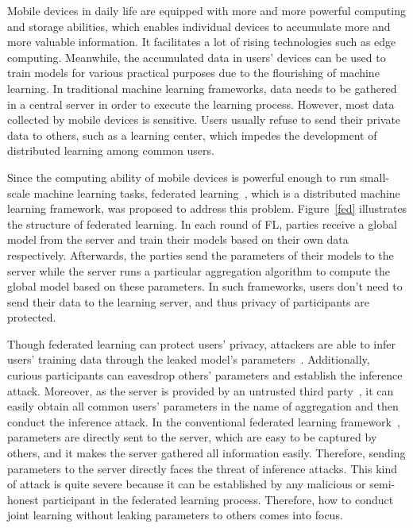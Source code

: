 Mobile devices in daily life are equipped with more and more powerful computing and storage abilities, which enables individual devices to accumulate more and more valuable information. It facilitates a lot of rising technologies such as edge computing. Meanwhile, the accumulated data in users' devices can be used to train models for various practical purposes due to the flourishing of machine learning. In traditional machine learning frameworks, data needs to be gathered in a central server in order to execute the learning process. However, most data collected by mobile devices is sensitive. Users usually refuse to send their private data to others, such as a learning center, which impedes the development of distributed learning among common users.

Since the computing ability of mobile devices is powerful enough to run small-scale machine learning tasks, federated learning~\cite{mcmahan2016communicationefficient}, which is a distributed machine learning framework, was proposed to address this problem. Figure~\ref{fed} illustrates the structure of federated learning. In each round of FL, parties receive a global model from the server and train their models based on their own data respectively. Afterwards, the parties send the parameters of their models to the server while the server runs a particular aggregation algorithm to compute the global model based on these parameters. In such frameworks, users don't need to send their data to the learning server, and thus privacy of participants are protected.

Though federated learning can protect users' privacy, attackers are able to infer users' training data through the leaked model's parameters~\cite{Beyond, Leakage, Nasr19}. Additionally, curious participants can eavesdrop others' parameters and establish the inference attack. Moreover, as the server is provided by an untrusted third party~\cite{Nasr19}, it can easily obtain all common users' parameters in the name of aggregation and then conduct the inference attack. In the conventional federated learning framework~\cite{mcmahan2016communicationefficient}, parameters are directly sent to the server, which are easy to be captured by others, and it makes the server gathered all information easily. Therefore, sending parameters to the server directly faces the threat of inference attacks. This kind of attack is quite severe because it can be established by any malicious or semi-honest participant in the federated learning process. Therefore, how to conduct joint learning without leaking parameters to others comes into focus.

